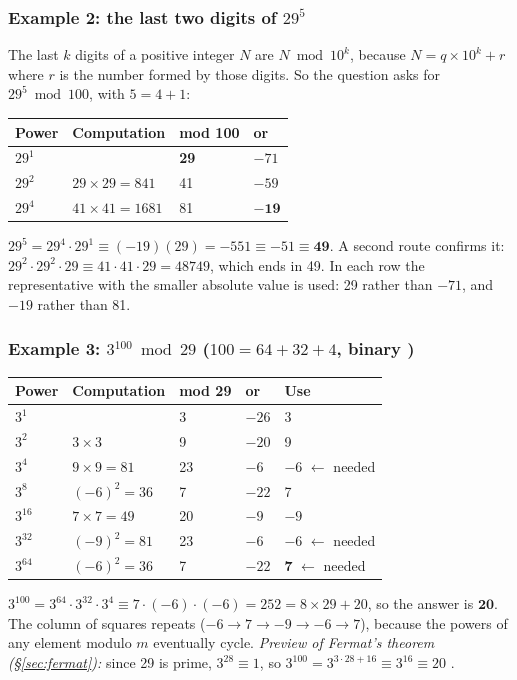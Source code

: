 \subsubsection*{Example 2: the last two digits of $29^5$}
The last $k$ digits of a positive integer $N$ are $N \bmod 10^k$, because $N = q \times 10^k + r$ where $r$ is the number formed by those digits. So the question asks for $29^5 \bmod 100$, with $5 = 4 + 1$:
\begin{center}\small
\begin{tabular}{@{}llll@{}}
\toprule
Power & Computation & mod 100 & or\\
\midrule
$29^1$ & & \textbf{29} & $-71$\\
$29^2$ & $29 \times 29 = 841$ & 41 & $-59$\\
$29^4$ & $41 \times 41 = 1681$ & 81 & $\mathbf{-19}$\\
\bottomrule
\end{tabular}
\end{center}
$29^5 = 29^4 \cdot 29^1 \equiv (-19)(29) = -551 \equiv -51 \equiv \mathbf{49}$. A second route confirms it: $29^2 \cdot 29^2 \cdot 29 \equiv 41 \cdot 41 \cdot 29 = 48749$, which ends in 49. In each row the representative with the smaller absolute value is used: 29 rather than $-71$, and $-19$ rather than 81.

\subsubsection*{Example 3: $3^{100} \bmod 29$ \quad ($100 = 64 + 32 + 4$, binary )}
\begin{center}\small
\begin{tabular}{@{}lllll@{}}
\toprule
Power & Computation & mod 29 & or & Use\\
\midrule
$3^1$ & & 3 & $-26$ & 3\\
$3^2$ & $3 \times 3$ & 9 & $-20$ & 9\\
$3^4$ & $9 \times 9 = 81$ & 23 & $-6$ & \textbf{$-6$} $\leftarrow$ needed\\
$3^8$ & $(-6)^2 = 36$ & 7 & $-22$ & 7\\
$3^{16}$ & $7 \times 7 = 49$ & 20 & $-9$ & $-9$\\
$3^{32}$ & $(-9)^2 = 81$ & 23 & $-6$ & \textbf{$-6$} $\leftarrow$ needed\\
$3^{64}$ & $(-6)^2 = 36$ & 7 & $-22$ & \textbf{7} $\leftarrow$ needed\\
\bottomrule
\end{tabular}
\end{center}
$3^{100} = 3^{64} \cdot 3^{32} \cdot 3^4 \equiv 7 \cdot (-6) \cdot (-6) = 252 = 8 \times 29 + 20$, so the answer is $\mathbf{20}$. The column of squares repeats ($-6 \to 7 \to -9 \to -6 \to 7$), because the powers of any element modulo $m$ eventually cycle. \emph{Preview of Fermat's theorem (\S\ref{sec:fermat}):} since 29 is prime, $3^{28} \equiv 1$, so $3^{100} = 3^{3 \cdot 28 + 16} \equiv 3^{16} \equiv 20$ \checkmark.

